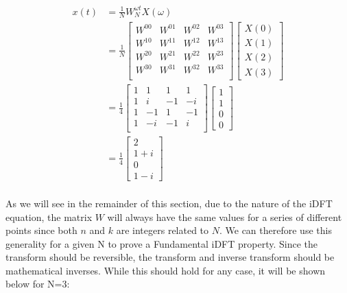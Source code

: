 \message{ !name(Assn2.tex)}\documentclass[twocolumn]{article}
\begin{document}
\begin{equation}
\begin{split}
x(t) &= \frac{1}{N} W^{\omega t}_N X(\omega) \\
&= \frac{1}{N} \begin{bmatrix}
W^{00} & W^{01} & W^{02} & W^{03} \\
W^{10} & W^{11} & W^{12} & W^{13} \\
W^{20} & W^{21} & W^{22} & W^{23} \\
W^{30} & W^{31} & W^{32} & W^{33} \\
\end{bmatrix} \begin{bmatrix}X(0) \\ X(1) \\ X(2) \\ X(3)\end{bmatrix} \\
&= \frac{1}{4} \begin{bmatrix}
1 & 1 & 1 & 1 \\
1 & i & -1 & -i \\
1 & -1 & 1 & -1 \\
1 & -i & -1 & i \\
\end{bmatrix} \begin{bmatrix}1 \\ 1 \\ 0 \\ 0\end{bmatrix} \\
&= \frac{1}{4} \begin{bmatrix}2 \\ 1+i \\ 0 \\ 1-i\end{bmatrix} \\
\end{split}
\end{equation}

As we will see in the remainder of this section, due to the nature of the iDFT equation, the matrix $W$ will always have the same values for a series of different points since both $n$ and $k$ are integers related to $N$. We can therefore use this generality for a given N to prove a Fundamental iDFT property. Since the transform should be reversible, the transform and inverse transform should be mathematical inverses. While this should hold for any case, it will be shown below for N=3:
\end{document}
